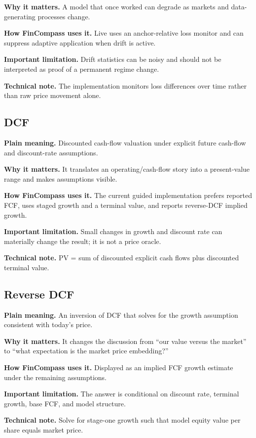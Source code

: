 \documentclass[11pt]{article}
\begin{document}
\textbf{Why it matters.} A model that once worked can degrade as markets and data-generating processes change.

\textbf{How FinCompass uses it.} Live uses an anchor-relative loss monitor and can suppress adaptive application when drift is active.

\textbf{Important limitation.} Drift statistics can be noisy and should not be interpreted as proof of a permanent regime change.

\textbf{Technical note.} The implementation monitors loss differences over time rather than raw price movement alone.

\subsection{DCF}
\textbf{Plain meaning.} Discounted cash-flow valuation under explicit future cash-flow and discount-rate assumptions.

\textbf{Why it matters.} It translates an operating/cash-flow story into a present-value range and makes assumptions visible.

\textbf{How FinCompass uses it.} The current guided implementation prefers reported FCF, uses staged growth and a terminal value, and reports reverse-DCF implied growth.

\textbf{Important limitation.} Small changes in growth and discount rate can materially change the result; it is not a price oracle.

\textbf{Technical note.} PV = sum of discounted explicit cash flows plus discounted terminal value.

\subsection{Reverse DCF}
\textbf{Plain meaning.} An inversion of DCF that solves for the growth assumption consistent with today’s price.

\textbf{Why it matters.} It changes the discussion from “our value versus the market” to “what expectation is the market price embedding?”

\textbf{How FinCompass uses it.} Displayed as an implied FCF growth estimate under the remaining assumptions.

\textbf{Important limitation.} The answer is conditional on discount rate, terminal growth, base FCF, and model structure.

\textbf{Technical note.} Solve for stage-one growth such that model equity value per share equals market price.
\end{document}
